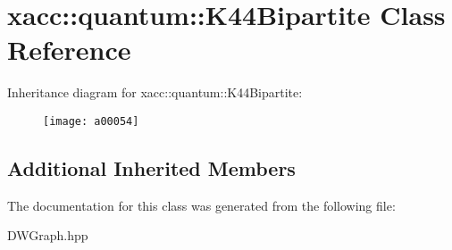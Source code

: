 \hypertarget{a00054}{}\section{xacc\+:\+:quantum\+:\+:K44\+Bipartite Class Reference}
\label{a00054}
Inheritance diagram for xacc\+:\+:quantum\+:\+:K44\+Bipartite\+:\begin{figure}[H]
\begin{center}
\leavevmode
\texttt{[image: a00054]}
\end{center}
\end{figure}
\subsection*{Additional Inherited Members}


The documentation for this class was generated from the following file\+:\begin{DoxyCompactItemize}
\item 
D\+W\+Graph.\+hpp\end{DoxyCompactItemize}
